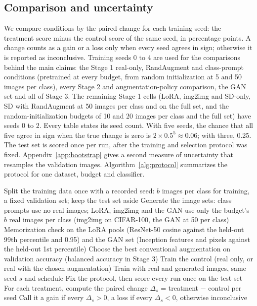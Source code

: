 \subsection{Comparison and uncertainty}
We compare conditions by the paired change for each training seed: the treatment score minus the control
score of the same seed, in percentage points. A change counts as a gain or a loss only when every seed agrees in
sign; otherwise it is reported as inconclusive. Training seeds 0 to 4 are used for the comparisons behind the main
claims: the Stage 1 real-only, RandAugment and class-prompt conditions (pretrained at every budget, from random
initialization at 5 and 50 images per class), every Stage 2 and augmentation-policy comparison, the GAN set and
all of Stage 3. The remaining Stage 1 cells (LoRA, img2img and SD-only, SD with RandAugment at 50 images per
class and on the full set, and the random-initialization budgets of 10 and 20 images per class and the full
set) have seeds 0 to 2. Every table states its seed count. With five seeds, the chance that all five agree in
sign when the true change is zero is $2 \times 0.5^5 \approx 0.06$; with three, 0.25. The test set is scored
once per run, after the training and selection protocol was fixed. Appendix~\ref{app:bootstrap} gives a second
measure of uncertainty that resamples the validation images.
Algorithm~\ref{alg:protocol} summarizes the protocol for one dataset, budget and classifier.

\begin{algorithm}[htbp]
	\caption{Study protocol for one dataset, budget $b$ and classifier}
	\label{alg:protocol}
	\begin{algorithmic}[1]
		\State Split the training data once with a recorded seed: $b$ images per class for training, a fixed
		validation set; keep the test set aside
		\State Generate the image sets: class prompts use no real images; LoRA, img2img and the GAN use only
		the budget's $b$ real images per class (img2img on CIFAR-100, the GAN at 50 per class)
		\State Memorization check on the LoRA pools (ResNet-50 cosine against the held-out 99th percentile and
		0.95) and the GAN set (Inception features and pixels against the held-out 1st percentile)
		\State Choose the best conventional augmentation on validation accuracy (balanced accuracy in Stage 3)
			\State Train the control (real only, or real with the chosen augmentation)
				\State Train with real and generated images, same seed $s$ and schedule
			\EndFor
		\EndFor
		\State Fix the protocol, then score every run once on the test set
		\State For each treatment, compute the paired change $\Delta_s$ = treatment $-$ control per seed
		\State Call it a gain if every $\Delta_s > 0$, a loss if every $\Delta_s < 0$, otherwise inconclusive
	\end{algorithmic}
\end{algorithm}

